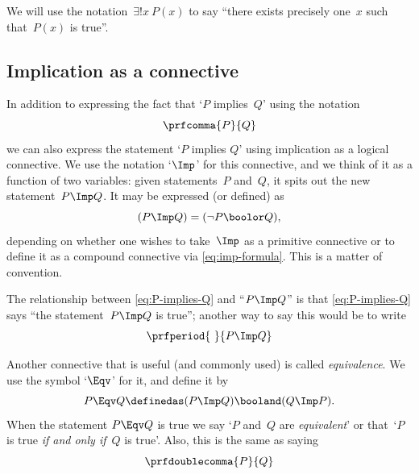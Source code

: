 We will use the notation~$\exists! x \ P(x)$ to say ``there exists precisely one~$x$ such that~$P(x)$ is true''.

\subsection{Implication as a connective}

In addition to expressing the fact that `$P$ implies~$Q$' using the notation
\begin{equation}
    \label{eq:P-implies-Q}
    \prfcomma
    {P}{Q}
\end{equation}
we can also express the statement `$P$ implies $Q$' using implication as a logical connective.
We use the notation `$\Imp$' for this connective, and we think of it as a function of two variables:
given statements~$P$ and~$Q$, it spits out the new statement~$P \Imp Q$.
It may be expressed (or defined) as
\begin{equation}
    \label{eq:imp-formula}
    (P \Imp Q) = (\lnot P \boolor Q),
\end{equation}
depending on whether one wishes to take~$\Imp$ as a primitive connective or to define it as a compound connective via \cref{eq:imp-formula}.
This is a matter of convention.

The relationship between \cref{eq:P-implies-Q} and ``$P \Imp Q$'' is that \cref{eq:P-implies-Q} says ``the statement~$P \Imp Q$ is true''; another way to say this would be to write
\begin{equation}
    \prfperiod
    {\ }{P \Imp Q}
\end{equation}

Another connective that is useful (and commonly used) is called \emph{equivalence}.
We use the symbol `$\Eqv$' for it, and define it by
\begin{equation}
    P \Eqv Q \definedas (P \Imp Q) \booland (Q \Imp P).
\end{equation}
When the statement $P \Eqv Q$ is true we say `$P$ and~$Q$ are \emph{equivalent}' or that~`$P$ is true \emph{if and only if}~$Q$ is true'.
Also, this is the same as saying
\begin{equation}
    \prfdoublecomma{
        P
    }{
        Q
    }
\end{equation}